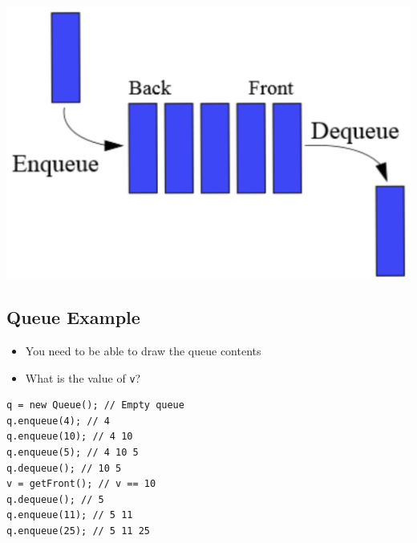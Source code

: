 \documentclass[10pt]{article}
\begin{document}
\begin{center}
\includegraphics[width=\textwidth/3]{images/2.png}
\end{center}



\subsection*{Queue Example}
\begin{itemize}
    \item You need to be able to draw the queue contents
    \item What is the value of \texttt{v}?
\end{itemize}
\begin{verbatim}
q = new Queue(); // Empty queue
q.enqueue(4); // 4
q.enqueue(10); // 4 10
q.enqueue(5); // 4 10 5
q.dequeue(); // 10 5
v = getFront(); // v == 10
q.dequeue(); // 5
q.enqueue(11); // 5 11
q.enqueue(25); // 5 11 25
\end{verbatim}
\end{document}
